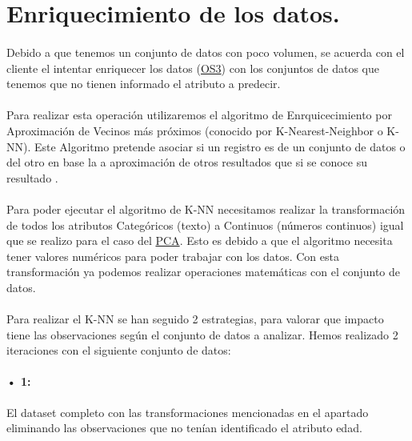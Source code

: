 \section{Enriquecimiento de los datos.}
\label{section:knn}

\paragraph{}
Debido a que tenemos un conjunto de datos con poco volumen, se acuerda con el cliente el intentar enriquecer los datos (\hyperref[os:OS3]{OS3}) con los conjuntos de datos que tenemos que no tienen informado el atributo a predecir.

\paragraph{}
Para realizar esta operación utilizaremos el algoritmo de Enrquicecimiento por Aproximación de Vecinos más próximos (conocido por K-Nearest-Neighbor o K-NN). Este Algoritmo pretende asociar si un registro es de un conjunto de datos o del otro en base la a aproximación de otros resultados que si se conoce su resultado \cite{ref:knn_def}.

\paragraph{}
Para poder ejecutar el algoritmo de K-NN necesitamos realizar la transformación de todos los
atributos Categóricos (texto) a Continuos (números continuos) igual que se realizo para el caso del \hyperref[section:pca]{PCA}. Esto es debido a que el algoritmo necesita tener valores numéricos para poder trabajar con los datos\cite{ref:knn_scaling}. Con esta transformación ya podemos realizar operaciones matemáticas con el conjunto de datos.

\paragraph{}
Para realizar el K-NN se han seguido 2 estrategias, para valorar que impacto tiene las observaciones según el conjunto de datos a analizar. Hemos realizado 2 iteraciones con el siguiente conjunto de datos:

\paragraph{• 1: } El dataset completo con las transformaciones mencionadas en el apartado  eliminando las observaciones que no tenían identificado el atributo edad.

